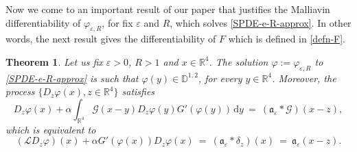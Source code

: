 \documentclass{article}
\newcommand{\assign}{:=}
\newcommand{\mathd}{\mathrm{d}}
\newtheorem{theorem}{Theorem}
\begin{document}
Now we come to an important result of our paper that justifies the Malliavin
differentiability of $\varphi_{\varepsilon, R}$, for fix $\varepsilon$ and
$R$, which solves \eqref{SPDE-e-R-approx}. In other words, the next result
gives the differentiability of $F$ which is defined in \eqref{defn-F}.
%
\begin{theorem} \label{thm-MallDiff}
  Let us fix $\varepsilon > 0$, $R > 1$ and $x \in
  \mathbb{R}^4$. The solution $\varphi \assign \varphi_{\varepsilon, R}$ to
  \eqref{SPDE-e-R-approx} is such that $\varphi (y) \in \mathbb{D}^{1, 2}$,
  for every $y \in \mathbb{R}^4$. Moreover, the process $\{ D_z \varphi (x), z
  \in \mathbb{R}^4 \}$ satisfies
  \[ 
       D_z \varphi (x) + \alpha \int_{\mathbb{R}^4} \mathcal{G} (x - y) D_z
       \varphi (y) G' (\varphi (y)) \, \mathd y ~=~ (\mathfrak{a}_{\varepsilon}
       \ast \mathcal{G}) (x - z),
      \]
  which is equivalent to
  \[ 
       (\mathcal{L}D_z \varphi) (x) + \alpha G' (\varphi (x)) D_z \varphi (x)
       ~=~ (\mathfrak{a}_{\varepsilon} \ast \delta_z) (x)
       ~=~\mathfrak{a}_{\varepsilon} (x - z) .
      \]
\end{theorem}
\end{document}
